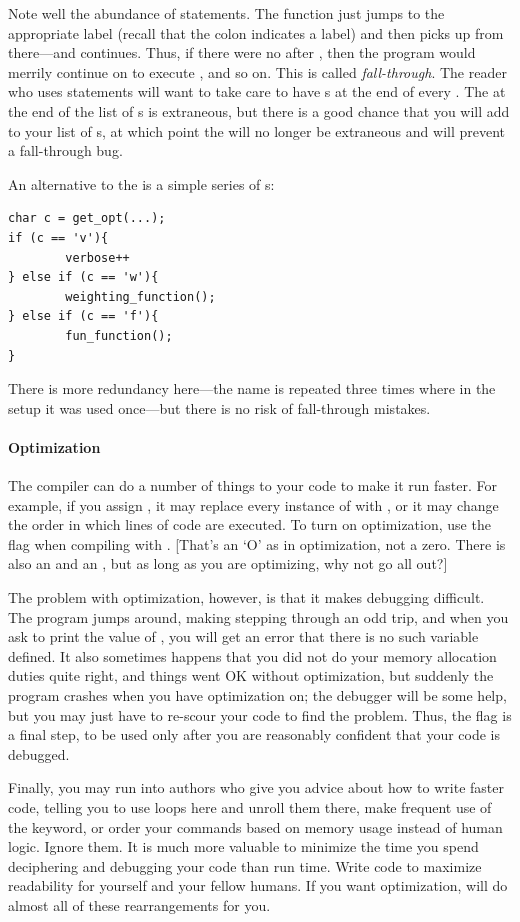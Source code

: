 \documentclass[12pt]{article}
\makeatletter
\def\ind#1{\index{#1}#1}
\def\cind#1{\index{#1@\ci{#1}}\ci{#1}}
\makeatother
\begin{document}
Note well the abundance of  statements.  The 
function just jumps to the appropriate label (recall that the colon
indicates a label) and then picks up from there---and continues. Thus,
if there were no  after , then the program
would merrily continue on to execute , and so
on. This is called {\sl fall-through}. The
reader who uses  statements will want to take care
to have s at the end of every .  The 
at the end of the list of s is extraneous, but there is a good
chance that you will add to your list of s, at which point
the  will no longer be extraneous and will prevent a fall-through bug.

An alternative to the  is a simple series of s:
\begin{lstlisting}
char c = get_opt(...);
if (c == 'v'){
        verbose++
} else if (c == 'w'){
        weighting_function();
} else if (c == 'f'){
        fun_function();
}
\end{lstlisting}
There is more redundancy here---the name  is repeated three times
where in the  setup it was used once---but there is no risk
of fall-through mistakes.


\paragraph{Optimization} 
The \cind{gcc} compiler can do a number of things to your code to make it
run faster. For example, if you assign , it may replace
every instance of  with , or it may change the order
in which lines of code are executed. To turn on \ind{optimization},
use the  flag when compiling with . [That's an `O'
as in optimization, not a zero. There is also an  and an , but as long as you are optimizing, why not go all out?]

The problem with optimization, however, is that it makes debugging
difficult. The program jumps around, making stepping through an odd
trip, and when you ask to print the value of , you will get
an error that there is no such variable defined.
It also sometimes happens that you did not do your memory allocation duties
quite right, and things went OK without optimization, but suddenly the
program crashes when you have optimization on; the debugger will be some
help, but you may just have to re-scour your code to find the problem.
Thus, the  flag is a final step, to be used only after you
are reasonably confident that your code is debugged.

Finally, you may run into authors who give you advice about how to write
faster code, telling you to use loops here and unroll them there, make
frequent use of the \cind{inline} keyword, or order your commands based
on memory usage instead of human logic. Ignore them. It is much more
valuable to minimize the time you spend deciphering and debugging your
code than run time.  Write code to maximize readability for yourself
and your fellow humans. If you want optimization,  will
do almost all of these rearrangements for you.


\label{end_c_crash}
\ifbook \else
\printindex
\end{document}
